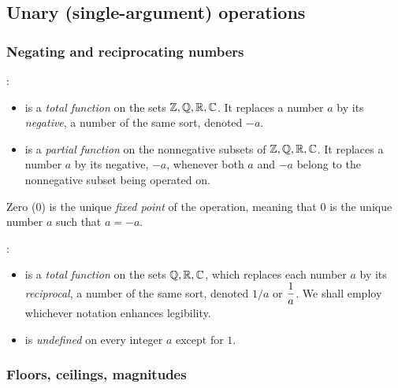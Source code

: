 \subsection{Unary (single-argument) operations}
\label{sec:unary-ops}


\subsubsection{Negating and reciprocating numbers}

:
\begin{itemize}
\item
is a {\em total function} on the sets $\mathbb{Z}, \mathbb{Q}, \mathbb{R}, \mathbb{C}$.  It replaces
a number $a$ by its {\em negative},
a number of the same sort, denoted $-a$.
\item
is a {\em partial function} on the nonnegative subsets
of $\mathbb{Z}, \mathbb{Q}, \mathbb{R}, \mathbb{C}$.  It replaces a number $a$ by its negative, $-a$,
whenever both $a$ and $-a$ belong to the nonnegative subset being
operated on.
\end{itemize}
Zero ($0$) is the unique {\it fixed point} of the operation,
meaning that $0$ is the unique number $a$ such that $a = -a$.

\medskip

:
\begin{itemize}
\item
{}
is a {\em total function} on the sets $\mathbb{Q}, \mathbb{R}, \mathbb{C}$, which replaces each
number $a$ by its {\em reciprocal}, 
a number of the same sort, denoted $1/a$ or $\displaystyle {1 \over
  a}$.  We shall employ whichever notation enhances legibility.

\item
is {\em undefined} on every integer $a$ except for $1$.
\end{itemize}

\subsubsection{Floors, ceilings, magnitudes}

